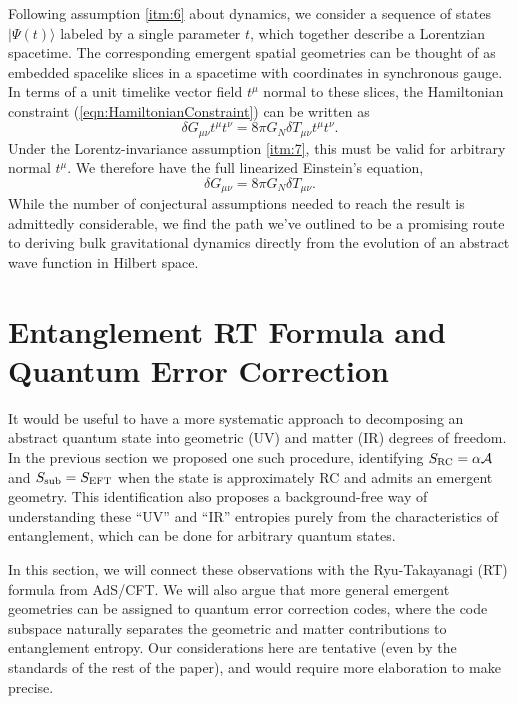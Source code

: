 \documentclass[%
12pt,preprint,
nofootinbib,
amsmath,amssymb,
aps,
prd,
showpacs,
superscriptaddress
]{revtex4-2}
\newcommand{\area}{\mathcal{A}}
\begin{document}
Following assumption \ref{itm:6} about dynamics, we consider a sequence of states $|\Psi (t)\rangle$ labeled by a single parameter $t$, which together describe a Lorentzian spacetime.
The corresponding emergent spatial geometries can be thought of as embedded spacelike slices in a spacetime with coordinates in synchronous gauge.
In terms of a unit timelike vector field $t^\mu$ normal to these slices, the Hamiltonian constraint (\ref{eqn:HamiltonianConstraint}) can be written as 
\begin{equation}
\delta G_{\mu\nu}t^{\mu}t^{\nu}= 8\pi G_N \delta T_{\mu\nu}t^{\mu}t^{\nu}.
\end{equation}
Under the Lorentz-invariance assumption \ref{itm:7}, this must be valid for arbitrary normal $t^{\mu}$. 
We therefore have the full linearized Einstein's equation,
\begin{equation}
\delta G_{\mu\nu}= 8\pi G_N \delta T_{\mu\nu}.
\end{equation}
While the number of conjectural assumptions needed to reach the result is admittedly considerable, we find the path we've outlined to be a promising route to deriving bulk gravitational dynamics directly from the evolution of an abstract wave function in Hilbert space.

\section{Entanglement RT Formula and Quantum Error Correction}\label{sec:generalizeRT}

It would be useful to have a more systematic approach to decomposing an abstract quantum state into geometric (UV) and matter (IR) degrees of freedom.
In the previous section we proposed one such procedure, identifying $S_{\rm RC}= \alpha \area$ and $S_{\mathrm{sub}}=S_{\rm EFT}$ when the state is approximately RC and admits an emergent geometry. This identification also proposes a background-free way of understanding these ``UV'' and ``IR'' entropies purely from the characteristics of entanglement, which can be done for arbitrary quantum states. 

In this section, we will connect these observations with the Ryu-Takayanagi (RT) formula from AdS/CFT. We will also argue that more general emergent geometries can be assigned to quantum error correction codes, where the code subspace naturally separates the geometric and matter contributions to entanglement entropy. Our considerations here are tentative (even by the standards of the rest of the paper), and would require more elaboration to make precise. 
\end{document}
